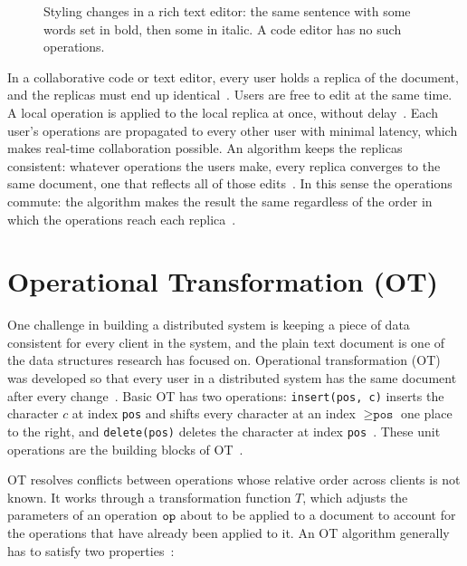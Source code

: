 \begin{figure}[htbp]
    \centering
    
    \caption[Styling changes in a rich text editor]{Styling changes in a rich text editor: the same sentence with some words set in bold, then some in italic. A code editor has no such operations.}
    \label{fig:2:richtext}
\end{figure}

In a collaborative code or text editor, every user holds a replica of the document, and the replicas must end up identical~\citep{Sun1998, Sun2004}. Users are free to edit at the same time. A local operation is applied to the local replica at once, without delay~\citep{attiya2016specification, Lv2015}. Each user's operations are propagated to every other user with minimal latency, which makes real-time collaboration possible. An algorithm keeps the replicas consistent: whatever operations the users make, every replica converges to the same document, one that reflects all of those edits~\citep{Sun1998, Sun2004, Sun2019First, Sun2019third}. In this sense the operations commute: the algorithm makes the result the same regardless of the order in which the operations reach each replica~\citep{Sun1998}.

\section{Operational Transformation (OT)}
\label{subsec:OT}

One challenge in building a distributed system is keeping a piece of data consistent for every client in the system, and the plain text document is one of the data structures research has focused on. Operational transformation (OT) was developed so that every user in a distributed system has the same document after every change~\citep{Sun1998}. Basic OT has two operations: \texttt{insert(pos, c)} inserts the character $c$ at index \texttt{pos} and shifts every character at an index $\geq \texttt{pos}$ one place to the right, and \texttt{delete(pos)} deletes the character at index \texttt{pos}~\citep{OTOverview1}. These unit operations are the building blocks of OT~\citep{OTOverview1}.

OT resolves conflicts between operations whose relative order across clients is not known. It works through a transformation function $T$, which adjusts the parameters of an operation $\texttt{op}$ about to be applied to a document to account for the operations that have already been applied to it. An OT algorithm generally has to satisfy two properties~\citep{crdtLecture, OTOverview1, Li2004, Ressel1996}:

